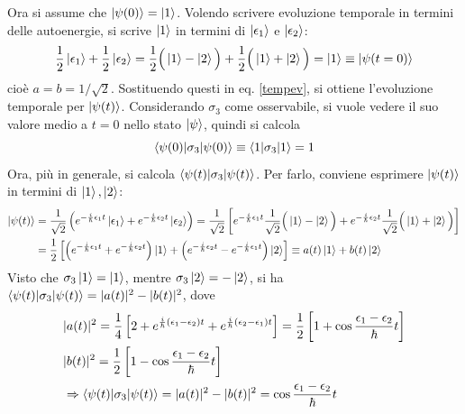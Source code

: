 \documentclass[11pt, a4paper]{scrartcl} %
\numberwithin{equation}{subsection}
\theoremstyle{style2}
\theoremstyle{style1}
\begin{document}
Ora si assume che $\ket{\psi (0)} = \ket{1} $. 
Volendo scrivere evoluzione temporale in termini delle autoenergie, si scrive $\ket{1} $ in termini di $\ket{\epsilon _1} $ e $\ket{\epsilon _2} $:
\[
\frac{1}{2 } \ket{\epsilon _1} + \frac{1}{2}\ket{\epsilon _2} = \frac{1}{2}\Big(\ket{1} - \ket{2} \Big) + \frac{1}{2} \Big(\ket{1} + \ket{2} \Big) = \ket{1} \equiv \ket{\psi (t=0)} 
\] 
cio\`e $a=b = 1/\sqrt{2} $.
Sostituendo questi in eq. \ref{tempev}, si ottiene l'evoluzione temporale per $\ket{\psi (t)} $.
Considerando $\sigma _3$ come osservabile, si vuole vedere il suo valore medio a $t=0$ nello stato $\ket{\psi } $, quindi si calcola
\[
\braket{\psi (0)|\sigma _3|\psi (0)} \equiv \braket{1|\sigma _3|1} = 1
\] 
Ora, pi\`u in generale, si calcola $\braket{\psi (t)|\sigma _3|\psi (t)} $. 
Per farlo, conviene esprimere $\ket{\psi (t)} $ in termini di $\ket{1} , \ket{2} $:
\[
	\begin{split}
		\ket{\psi (t)} &=\frac{1}{\sqrt{2} }\left(e^{-\frac{i}{\hbar }\epsilon _1 t} \ket{\epsilon _1}  + e^{-\frac{i}{\hbar }\epsilon _2 t} \ket{\epsilon _2}  \right) = \frac{1}{\sqrt{2} } \left[ e^{-\frac{i}{\hbar }\epsilon _1 t} \frac{1}{\sqrt{2} } \Big(\ket{1} -\ket{2} \Big)+ e^{-\frac{i}{\hbar }\epsilon _2 t} \frac{1}{\sqrt{2} } \Big(\ket{1} +\ket{2} \Big)  \right]\\
			       &= \frac{1}{2} \left[ \left( e^{-\frac{i}{\hbar }\epsilon _1 t} + e^{-\frac{i}{\hbar }\epsilon _2 t}  \right) \ket{1} + \left( e^{-\frac{i}{\hbar }\epsilon _2 t} - e^{-\frac{i}{\hbar }\epsilon _1 t}  \right) \ket{2} \right] \equiv a(t) \ket{1}  + b(t) \ket{2} 
	\end{split}
\] 
Visto che $\sigma _3 \ket{1} = \ket{1} $, mentre $\sigma _3 \ket{2}  = - \ket{2} $, si ha $\braket{\psi (t)|\sigma _3|\psi (t)} = \lvert a(t) \rvert ^2 - \lvert b(t) \rvert ^2$, dove
\[
\begin{split}
	&\lvert a(t) \rvert ^2 = \frac{1}{4}\left[  2 + e^{\frac{i}{\hbar }(\epsilon_1 - \epsilon _2)  t}  + e^{\frac{i}{\hbar } (\epsilon _2 - \epsilon _1)t} \right]  = \frac{1}{2}\left[ 1 +\cos \frac{\epsilon _1 - \epsilon _2}{\hbar }t \right] \\
	& \lvert b(t) \rvert ^2 = \frac{1}{2}\left[ 1- \cos \frac{\epsilon _1 - \epsilon _2}{\hbar }t \right] \\
	&\Rightarrow \braket{\psi (t)|\sigma _3|\psi (t)} = \lvert a(t) \rvert ^2 - \lvert b (t)\rvert ^2 = \cos \frac{\epsilon _1 - \epsilon _2}{\hbar }t
\end{split}
\] 
\end{document}
